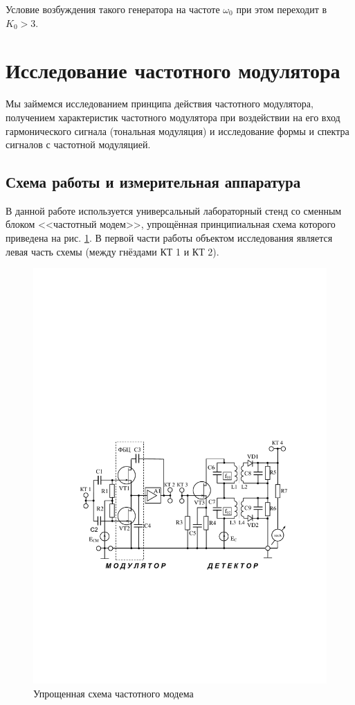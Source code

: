 \documentclass[a4paper,12pt]{article}
\begin{document}
Условие возбуждения такого генератора на частоте $\omega_0$ при этом переходит в $K_0 > 3$. 

\section{Исследование частотного модулятора}
Мы займемся исследованием принципа действия частотного модулятора, получением характеристик частотного модулятора при воздействии на его вход гармонического сигнала (тональная модуляция) и исследование формы и спектра сигналов с частотной модуляцией.

\subsection{Схема работы и измерительная аппаратура}
В данной работе используется универсальный лабораторный стенд со сменным блоком <<частотный модем>>, упрощённая принципиальная схема которого приведена на рис. \ref{fig:6.1}. В первой части работы объектом исследования является левая часть схемы (между гнёздами КТ 1 и КТ 2).
\begin{figure}[H]
	\centering
	\includegraphics[scale=1]{fig/fig6-1}
	\caption{Упрощенная схема частотного модема}
	\label{fig:6.1}
\end{figure}
\end{document}
